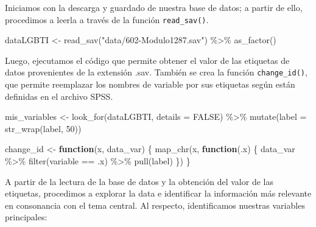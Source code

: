 \documentclass[
]{book}
\newenvironment{Shaded}{\begin{snugshade}}{\end{snugshade}}
\newcommand{\AttributeTok}[1]{\textcolor[rgb]{0.77,0.63,0.00}{#1}}
\newcommand{\ConstantTok}[1]{\textcolor[rgb]{0.00,0.00,0.00}{#1}}
\newcommand{\ControlFlowTok}[1]{\textcolor[rgb]{0.13,0.29,0.53}{\textbf{#1}}}
\newcommand{\DecValTok}[1]{\textcolor[rgb]{0.00,0.00,0.81}{#1}}
\newcommand{\FunctionTok}[1]{\textcolor[rgb]{0.00,0.00,0.00}{#1}}
\newcommand{\NormalTok}[1]{#1}
\newcommand{\OtherTok}[1]{\textcolor[rgb]{0.56,0.35,0.01}{#1}}
\newcommand{\SpecialCharTok}[1]{\textcolor[rgb]{0.00,0.00,0.00}{#1}}
\newcommand{\StringTok}[1]{\textcolor[rgb]{0.31,0.60,0.02}{#1}}
\theoremstyle{definition}
\theoremstyle{definition}
\theoremstyle{definition}
\theoremstyle{definition}
\theoremstyle{remark}
\begin{document}
Iniciamos con la descarga y guardado de nuestra base de datos; a partir de ello, procedimos a leerla a través de la función \texttt{read\_sav()}.

\begin{Shaded}
\begin{Highlighting}[]
\NormalTok{dataLGBTI }\OtherTok{\textless{}{-}} \FunctionTok{read\_sav}\NormalTok{(}\StringTok{"data/602{-}Modulo1287.sav"}\NormalTok{) }\SpecialCharTok{\%\textgreater{}\%} \FunctionTok{as\_factor}\NormalTok{()}
\end{Highlighting}
\end{Shaded}

Luego, ejecutamos el código que permite obtener el valor de las etiquetas de datos provenientes de la extensión .sav. También se crea la función \texttt{change\_id()}, que permite reemplazar los nombres de variable por sus etiquetas según están definidas en el archivo SPSS.

\begin{Shaded}
\begin{Highlighting}[]
\NormalTok{mis\_variables }\OtherTok{\textless{}{-}} \FunctionTok{look\_for}\NormalTok{(dataLGBTI, }\AttributeTok{details =} \ConstantTok{FALSE}\NormalTok{) }\SpecialCharTok{\%\textgreater{}\%} \FunctionTok{mutate}\NormalTok{(}\AttributeTok{label =} \FunctionTok{str\_wrap}\NormalTok{(label, }\DecValTok{50}\NormalTok{))}

\NormalTok{change\_id }\OtherTok{\textless{}{-}} \ControlFlowTok{function}\NormalTok{(x, data\_var) \{}
  \FunctionTok{map\_chr}\NormalTok{(x, }\ControlFlowTok{function}\NormalTok{(.x) \{}
\NormalTok{    data\_var }\SpecialCharTok{\%\textgreater{}\%} 
      \FunctionTok{filter}\NormalTok{(variable }\SpecialCharTok{==}\NormalTok{ .x) }\SpecialCharTok{\%\textgreater{}\%} 
      \FunctionTok{pull}\NormalTok{(label)}
\NormalTok{  \})}
\NormalTok{\}}
\end{Highlighting}
\end{Shaded}

A partir de la lectura de la base de datos y la obtención del valor de las etiquetas, procedimos a explorar la data e identificar la información más relevante en consonancia con el tema central. Al respecto, identificamos nuestras variables principales:
\end{document}
